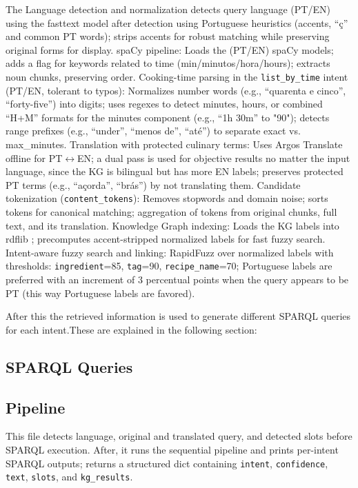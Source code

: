 \documentclass{article}
\begin{document}
The Language detection and normalization detects query language (PT/EN) using the fasttext model \cite{joulin2016fasttext} after detection using Portuguese heuristics (accents, “ç” and common PT words); strips accents for robust matching while preserving original forms for display. spaCy pipeline: Loads the (PT/EN) spaCy models; adds a flag for keywords related to time (min/minutos/hora/hours); extracts noun chunks, preserving order. Cooking-time parsing in the \texttt{list\_by\_time} intent (PT/EN, tolerant to typos): Normalizes number words (e.g., ``quarenta e cinco'', ``forty-five'') into digits; uses regexes to detect minutes, hours, or combined ``H+M'' formats for the minutes component (e.g., ``1h 30m'' to "90"); detects range prefixes (e.g., ``under'', ``menos de'', ``até'') to separate exact vs. max\_minutes. Translation with protected culinary terms: Uses Argos Translate offline \cite{argos_opentech} for PT$\leftrightarrow$EN; a dual pass is used for objective results no matter the input language, since the KG is bilingual but has more EN labels; preserves protected PT terms (e.g., ``açorda'', ``brás'') by not translating them. Candidate tokenization (\texttt{content\_tokens}): Removes stopwords and domain noise; sorts tokens for canonical matching; aggregation of tokens from original chunks, full text, and its translation. Knowledge Graph indexing: Loads the KG labels into rdflib \cite{rdflib_docs}; precomputes accent-stripped normalized labels for fast fuzzy search. Intent-aware fuzzy search and linking: RapidFuzz \cite{rapidfuzz_github} over normalized labels with thresholds: \texttt{ingredient}=85, \texttt{tag}=90, \texttt{recipe\_name}=70; Portuguese labels are preferred with an increment of 3 percentual points when the query appears to be PT (this way Portuguese labels are favored).


After this the retrieved information is used to generate different SPARQL queries for each intent.These are explained in the following section: 

\subsection{SPARQL Queries}




\subsection{Pipeline}


This file detects language, original and translated query, and detected slots before SPARQL execution.
After, it runs the sequential pipeline and prints per-intent SPARQL outputs; returns a structured dict containing \texttt{intent}, \texttt{confidence}, \texttt{text}, \texttt{slots}, and \texttt{kg\_results}.
\end{document}
